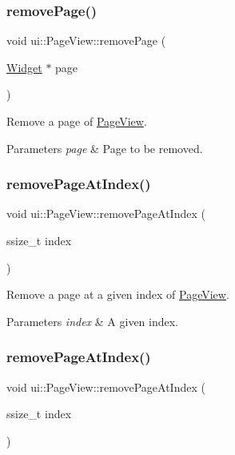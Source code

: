 \subsubsection{\texorpdfstring{remove\+Page()}{removePage()}\hspace{0.1cm}{\footnotesize\ttfamily [2/2]}}
{\footnotesize\ttfamily void ui\+::\+Page\+View\+::remove\+Page (\begin{DoxyParamCaption}\item[{\hyperlink{classui_1_1Widget}{Widget} $\ast$}]{page }\end{DoxyParamCaption})}

Remove a page of \hyperlink{classui_1_1PageView}{Page\+View}.


\begin{DoxyParams}{Parameters}
{\em page} & Page to be removed. \\
\hline
\end{DoxyParams}
\mbox{\label{classui_1_1PageView_a58351bb2e6b271b846b56db3a5ae302b}} 
\subsubsection{\texorpdfstring{remove\+Page\+At\+Index()}{removePageAtIndex()}\hspace{0.1cm}{\footnotesize\ttfamily [1/2]}}
{\footnotesize\ttfamily void ui\+::\+Page\+View\+::remove\+Page\+At\+Index (\begin{DoxyParamCaption}\item[{ssize\+\_\+t}]{index }\end{DoxyParamCaption})}

Remove a page at a given index of \hyperlink{classui_1_1PageView}{Page\+View}.


\begin{DoxyParams}{Parameters}
{\em index} & A given index. \\
\hline
\end{DoxyParams}
\mbox{\label{classui_1_1PageView_a58351bb2e6b271b846b56db3a5ae302b}} 
\subsubsection{\texorpdfstring{remove\+Page\+At\+Index()}{removePageAtIndex()}\hspace{0.1cm}{\footnotesize\ttfamily [2/2]}}
{\footnotesize\ttfamily void ui\+::\+Page\+View\+::remove\+Page\+At\+Index (\begin{DoxyParamCaption}\item[{ssize\+\_\+t}]{index }\end{DoxyParamCaption})}

